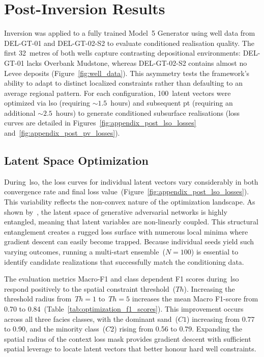 \section{Post-Inversion Results}\label{Sec:Post_Cond_Res}
Inversion was applied to a fully trained Model~5 Generator using well data from DEL-GT-01 and DEL-GT-02-S2 to evaluate conditioned realisation quality. The first 32~metres of both wells capture contrasting depositional environments: DEL-GT-01 lacks Overbank Mudstone, whereas DEL-GT-02-S2 contains almost no Levee deposits (Figure~\ref{fig:well_data}). This asymmetry tests the framework's ability to adapt to distinct localized constraints rather than defaulting to an average regional pattern. For each configuration, 100~latent vectors were optimized via \gls{lso} (requiring $\sim 1.5$~hours) and subsequent \gls{pt} (requiring an additional $\sim 2.5$~hours) to generate conditioned subsurface realisations (loss curves are detailed in Figures~\ref{fig:appendix_post_lso_losses} and~\ref{fig:appendix_post_pv_losses}).

\subsection{Latent Space Optimization}
During~\gls{lso}, the loss curves for individual latent vectors vary considerably in both convergence rate and final loss value~(Figure~\ref{fig:appendix_post_lso_losses}). This variability reflects the non-convex nature of the optimization landscape. As shown by~\textcite{rongier2025btowards}, the latent space of generative adversarial networks is highly entangled, meaning that latent variables are non-linearly coupled. This structural entanglement creates a rugged loss surface with numerous local minima where gradient descent can easily become trapped. Because individual seeds yield such varying outcomes, running a multi-start ensemble~($N = 100$) is essential to identify candidate realizations that successfully match the conditioning data.

The evaluation metrics Macro-F1 and class dependent F1 scores during~\gls{lso} respond positively to the spatial constraint threshold~($Th$). Increasing the threshold radius from~$Th=1$ to~$Th=5$ increases the mean Macro F1-score from 0.70 to 0.84~(Table~\ref{tab:optimization_f1_scores}). This improvement occurs across all three facies classes, with the dominant sand~($C1$) increasing from 0.77 to 0.90, and the minority class~($C2$) rising from 0.56 to 0.79. Expanding the spatial radius of the context loss mask provides gradient descent with sufficient spatial leverage to locate latent vectors that better honour hard well constraints.

